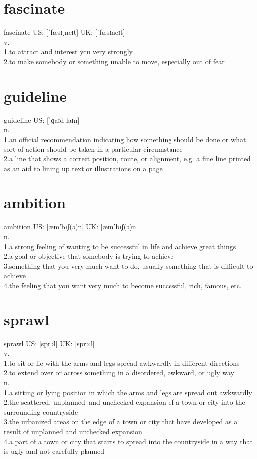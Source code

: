 \documentclass[11pt]{article}
\begin{document}
\section{fascinate}
\label{sec:org96f95a8}
fascinate US: [ˈfæsɪˌneɪt] UK: [ˈfæsɪneɪt]\\
v.\\
1.to attract and interest you very strongly\\
2.to make somebody or something unable to move, especially out of fear\\
\section{guideline}
\label{sec:org9db8341}
guideline US: [ˈɡaɪdˈlaɪn]\\
n.\\
1.an official recommendation indicating how something should be done or what sort of action should be taken in a particular circumstance\\
2.a line that shows a correct position, route, or alignment, e.g. a fine line printed as an aid to lining up text or illustrations on a page\\
\section{ambition}
\label{sec:orgb60b3b0}
ambition US: [æm'bɪʃ(ə)n] UK: [æm'bɪʃ(ə)n]\\
n.\\
1.a strong feeling of wanting to be successful in life and achieve great things\\
2.a goal or objective that somebody is trying to achieve\\
3.something that you very much want to do, usually something that is difficult to achieve\\
4.the feeling that you want very much to become successful, rich, famous, etc.\\
\section{sprawl}
\label{sec:org70bb3cf}
sprawl US: [sprɔl] UK: [sprɔːl]\\
v.\\
1.to sit or lie with the arms and legs spread awkwardly in different directions\\
2.to extend over or across something in a disordered, awkward, or ugly way\\
n.\\
1.a sitting or lying position in which the arms and legs are spread out awkwardly\\
2.the scattered, unplanned, and unchecked expansion of a town or city into the surrounding countryside\\
3.the urbanized areas on the edge of a town or city that have developed as a result of unplanned and unchecked expansion\\
4.a part of a town or city that starts to spread into the countryside in a way that is ugly and not carefully planned\\
\end{document}
